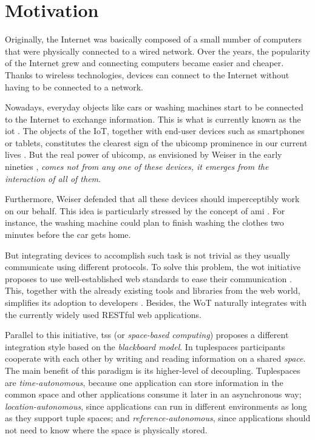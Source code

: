 \section{Motivation}
\label{sec:Motivation}


Originally, the Internet was basically composed of a small number of computers that were physically connected to a wired network.
Over the years, the popularity of the Internet grew and connecting computers became easier and cheaper.
Thanks to wireless technologies, devices can connect to the Internet without having to be connected to a network.

Nowadays, everyday objects like cars or washing machines start to be connected to the Internet to exchange information.
This is what is currently known as the \ac{iot} \cite{atzori_internet_2010}.
The objects of the IoT, together with end-user devices such as smartphones or tablets, constitutes the clearest sign of the \ac{ubicomp} prominence in our current lives \cite{caceres_ubicomp_2012}.
But the real power of \ac{ubicomp}, as envisioned by Weiser in the early nineties \cite{weiser1991computer}, \emph{comes not from any one of these devices, it emerges from the interaction of all of them}.

Furthermore, Weiser defended that all these devices should imperceptibly work on our behalf.
This idea is particularly stressed by the concept of \ac{ami} \cite{ramos_ambient_2008}.
For instance, the washing machine could plan to finish washing the clothes two minutes before the car gets home.

\medskip

But integrating devices to accomplish such task is not trivial as they usually communicate using different protocols.
To solve this problem, the \ac{wot} initiative proposes to use well-established web standards to ease their communication \cite{guinard_thesis_2011}.
This, together with the already existing tools and libraries from the web world, simplifies its adoption to developers \cite{guinard_search_2011}.
Besides, the WoT naturally integrates with the currently widely used RESTful web applications.

Parallel to this initiative, \aclp{ts} (or \emph{space-based computing}) \cite{gelernter_generative_1985} proposes a different integration style based on the \emph{blackboard model}.
In tuplespaces participants cooperate with each other by writing and reading information on a shared \emph{space}.
The main benefit of this paradigm is its higher-level of decoupling.
Tuplespaces are
\emph{time-autonomous}, because one application can store information in the common space and other applications consume it later in an asynchronous way;
\emph{location-autonomous}, since applications can run in different environments as long as they support tuple spaces;
and \emph{reference-autonomous}, since applications should not need to know where the space is physically stored.

